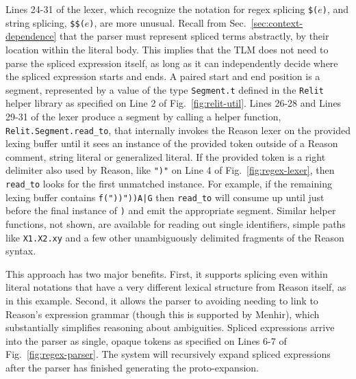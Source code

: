 \documentclass[acmsmall]{acmart}
\newcommand{\li}[1]{\lstinline[basicstyle=\ttfamily\fontsize{9pt}{1em}\selectfont]{#1}}
\begin{document}
Lines 24-31 of the lexer, which recognize the notation for regex splicing \li{$(}$e$\li{)}, and string splicing, \li{$$(}$e$\li{)}, are more unusual. Recall from Sec.~\ref{sec:context-dependence} that the parser must represent spliced terms abstractly, by their location within the literal body. This implies that the TLM does not need to parse the spliced expression itself, as long as it can independently decide where the spliced expression starts and ends. A paired start and end position is a segment,  represented by a value of the type \li{Segment.t} defined in the \li{Relit} helper library as specified on Line 2 of Fig.~\ref{fig:relit-util}. Lines 26-28 and Lines 29-31 of the lexer produce a segment by calling a helper function, \li{Relit.Segment.read_to}, that internally invokes the Reason lexer on the provided lexing buffer until it sees an instance of the provided token outside of a Reason comment, string literal or generalized literal. If the provided token is a right delimiter also used by Reason, like \li{")"} on Line 4 of Fig.~\ref{fig:regex-lexer}, then \li{read_to} looks for the first unmatched instance. For example, if the remaining lexing buffer contains {\small \texttt{f("))"))A|G}} then \li{read_to} will consume up until just before the final instance of \li{)} and emit the appropriate segment. Similar helper functions, not shown, are available for reading out single identifiers, simple paths like \li{X1.X2.xy} and a few other unambiguously delimited fragments of the Reason syntax.

This approach has two major benefits. First, it supports splicing even within literal notations that have a very different lexical structure from Reason itself, as in this example. Second, it allows the parser to avoiding needing to link to Reason's expression grammar (though this is supported by Menhir), which substantially simplifies reasoning about ambiguities. Spliced expressions arrive into the parser as single, opaque tokens as specified on Lines 6-7 of Fig.~\ref{fig:regex-parser}. The system will recursively expand spliced expressions after the parser has finished generating the proto-expansion.


\end{document}
